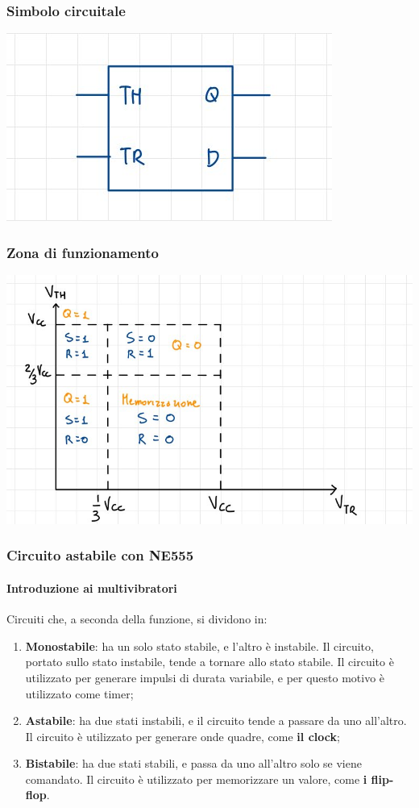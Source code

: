 \documentclass[11pt,a4paper,]{article}
\begin{document}
\subsubsection{Simbolo circuitale}
\begin{center}
	\includegraphics[width=0.3\linewidth]{"img/ne555 s circ"}
\end{center}
\subsubsection{Zona di funzionamento}
\begin{center}
	\includegraphics[width=0.4\linewidth]{"img/ne555 zf"}
\end{center}
\subsubsection{Circuito astabile con NE555}
\paragraph{Introduzione ai multivibratori}
Circuiti che, a seconda della funzione, si dividono in:
\begin{enumerate}
	\item \textbf{Monostabile}: ha un solo stato stabile, e l'altro è instabile. Il circuito, portato sullo stato instabile, tende a tornare allo stato stabile. Il circuito è utilizzato per generare impulsi di durata variabile, e per questo motivo è utilizzato come timer;
	\item \textbf{Astabile}: ha due stati instabili, e il circuito tende a passare da uno all'altro. Il circuito è utilizzato per generare onde quadre, come \textbf{il clock};
	\item \textbf{Bistabile}: ha due stati stabili, e passa da uno all'altro solo se viene comandato. Il circuito è utilizzato per memorizzare un valore, come \textbf{i flip-flop}.
\end{enumerate}
\end{document}
